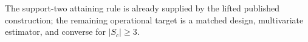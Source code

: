 The support-two attaining rule is already supplied by the lifted published construction; the remaining operational target is a matched design, multivariate estimator, and converse for \(|S_c|\geq3\).